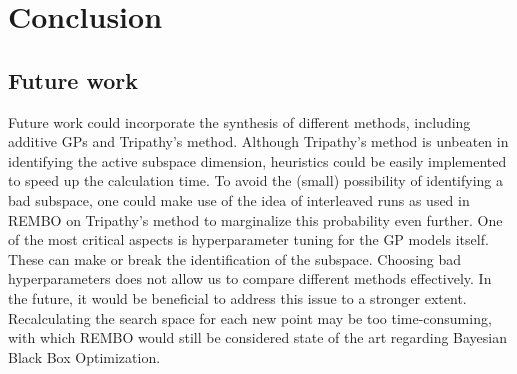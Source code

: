 \chapter{Conclusion}

\ifpdf
    \graphicspath{{Chapter7/Figs/Raster/}{Chapter7/Figs/PDF/}{Chapter7/Figs/}}
\else
    \graphicspath{{Chapter7/Figs/Vector/}{Chapter7/Figs/}}
\fi


\section{Future work}

Future work could incorporate the synthesis of different methods, including additive GPs and Tripathy's method.
Although Tripathy's method is unbeaten in identifying the active subspace dimension, heuristics could be easily implemented to speed up the calculation time.
To avoid the (small) possibility of identifying a bad subspace, one could make use of the idea of interleaved runs as used in REMBO on Tripathy's method to marginalize this probability even further.
One of the most critical aspects is hyperparameter tuning for the GP models itself.
These can make or break the identification of the subspace.
Choosing bad hyperparameters does not allow us to compare different methods effectively.
In the future, it would be beneficial to address this issue to a stronger extent.
Recalculating the search space for each new point may be too time-consuming, with which REMBO would still be considered state of the art regarding Bayesian Black Box Optimization.
 



